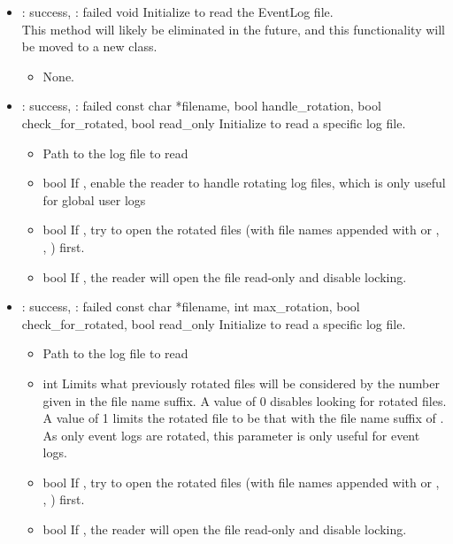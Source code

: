 \begin{itemize}

\item {}
  {} {: success, : failed}
  {void}
  {Initialize to read the EventLog file.
  \\ \Note This method will likely be eliminated in the future, and this
  functionality will be moved to a new  class.}
  \begin{itemize}\item None. \end{itemize}

\item {}
  {} {: success, : failed}
  {const char *filename, bool handle\_rotation,
    bool check\_for\_rotated, bool read\_only}
  {Initialize to read a specific log file.}
  \begin{itemize}
  \item {}
    Path to the log file to read
  \item {} {bool} {}
    If , enable the reader to handle rotating log files,
    which is only useful for global user logs
  \item {} {bool} {}
    If , try to open the rotated files
    (with file names appended with  or , , \Dots)
    first.
  \item {} {bool} {}
    If , the reader will open the file read-only and
    disable locking.
  \end{itemize}

\item {}
  {} {: success, : failed}
  {const char *filename, int max\_rotation,
    bool check\_for\_rotated, bool read\_only}
  {Initialize to read a specific log file.}
  \begin{itemize}
  \item {}
    Path to the log file to read
  \item {} {int}
    Limits what previously rotated files will be considered by the number
    given in the file name suffix.
    A value of 0 disables looking for rotated files.
    A value of 1 limits the rotated file to be that with the file name suffix
    of .
    As only event logs are rotated, this parameter is only useful for
    event logs.
  \item {} {bool} {}
    If , try to open the rotated files
    (with file names appended with  or , , \Dots)
    first.
  \item {} {bool} {}
    If , the reader will open the file read-only and
    disable locking.
  \end{itemize}


\end{itemize}
